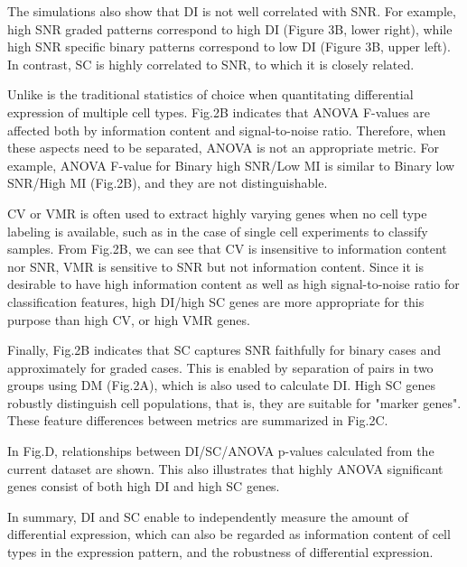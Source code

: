 The simulations also show that DI is not well correlated with SNR. For example, high SNR graded patterns correspond to high DI (Figure 3B, lower right), while high SNR specific binary patterns correspond to low DI (Figure 3B, upper left). In contrast, SC is highly correlated to SNR, to which it is closely related. 

Unlike  is the traditional statistics of choice when quantitating differential expression of multiple cell types. Fig.2B indicates that ANOVA F-values are affected both by information content and signal-to-noise ratio. Therefore, when these aspects need to be separated, ANOVA is not an appropriate metric. For example, ANOVA F-value for Binary high SNR/Low MI is similar to Binary low SNR/High MI (Fig.2B), and they are not distinguishable. 

CV or VMR is often used to extract highly varying genes when no cell type labeling is available, such as in the case of single cell experiments to classify samples. From Fig.2B, we can see that CV is insensitive to information content nor SNR, VMR is sensitive to SNR but not information content.  Since it is desirable to have high information content as well as high signal-to-noise ratio for classification features, high DI/high SC genes are more appropriate for this purpose than high CV, or high VMR genes. 

Finally, Fig.2B indicates that SC captures SNR faithfully for binary cases and approximately for graded cases. This is enabled by separation of pairs in two groups using DM (Fig.2A), which is also used to calculate DI. High SC genes robustly distinguish cell populations, that is, they are suitable for "marker genes".  These feature differences between metrics are summarized in Fig.2C.

In Fig.D, relationships between DI/SC/ANOVA p-values calculated from the current dataset are shown. This also illustrates that highly  ANOVA significant genes consist of both high DI and high SC genes. 

In summary, DI and SC enable to independently measure the amount of differential expression, which can also be regarded as information content of cell types in the expression pattern, and the robustness of differential expression.